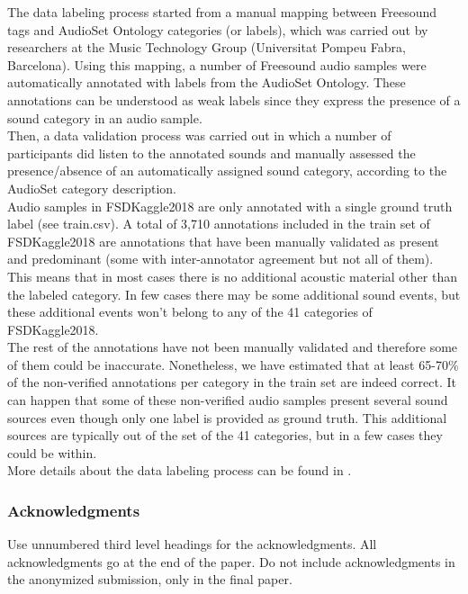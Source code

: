 \documentclass{article} %
\begin{document}
		The data labeling process started from a manual mapping between Freesound tags and AudioSet Ontology categories (or labels), which was carried out by researchers at the Music Technology Group (Universitat Pompeu Fabra, Barcelona). Using this mapping, a number of Freesound audio samples were automatically annotated with labels from the AudioSet Ontology. These annotations can be understood as weak labels since they express the presence of a sound category in an audio sample.\\
		\newline
		Then, a data validation process was carried out in which a number of participants did listen to the annotated sounds and manually assessed the presence/absence of an automatically assigned sound category, according to the AudioSet category description.\\
		\newline
		Audio samples in FSDKaggle2018 are only annotated with a single ground truth label (see train.csv). A total of 3,710 annotations included in the train set of FSDKaggle2018 are annotations that have been manually validated as present and predominant (some with inter-annotator agreement but not all of them). This means that in most cases there is no additional acoustic material other than the labeled category. In few cases there may be some additional sound events, but these additional events won't belong to any of the 41 categories of FSDKaggle2018.\\
		\newline
		The rest of the annotations have not been manually validated and therefore some of them could be inaccurate. Nonetheless, we have estimated that at least 65-70\% of the non-verified annotations per category in the train set are indeed correct. It can happen that some of these non-verified audio samples present several sound sources even though only one label is provided as ground truth. This additional sources are typically out of the set of the 41 categories, but in a few cases they could be within.\\
		\newline
		More details about the data labeling process can be found in \cite{cite8}.

\subsubsection*{Acknowledgments}

Use unnumbered third level headings for the acknowledgments. All
acknowledgments go at the end of the paper. Do not include 
acknowledgments in the anonymized submission, only in the 
final paper. 

\nocite{*}


\end{document}
